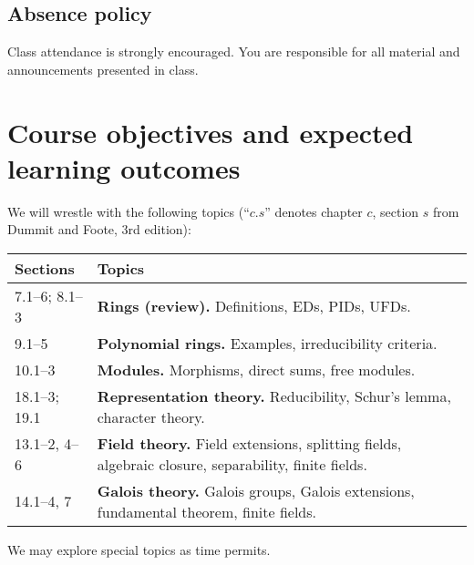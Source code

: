 


\subsection{Absence policy}

Class attendance is strongly encouraged. You are responsible for all material and announcements presented in class.





%
%
%
%

\newpage

\section{Course objectives and expected learning outcomes}

We will wrestle with the following topics (``$c.s$'' denotes chapter $c$, section $s$ from Dummit and Foote, 3rd edition):
\begin{center}
\begin{tabular}{l p{4.8in}}
\hline\hline
Sections		&	Topics									\\
\hline
7.1--6; 8.1--3	&	\textbf{Rings (review).} Definitions, EDs, PIDs, UFDs.	\\
9.1--5			&	\textbf{Polynomial rings.} Examples, irreducibility criteria.	\\
10.1--3			&	\textbf{Modules.} Morphisms, direct sums, free modules.	\\
18.1--3; 19.1	&	\textbf{Representation theory.} Reducibility, Schur's lemma, character theory.	\\
13.1--2, 4--6	&	\textbf{Field theory.} Field extensions, splitting fields, algebraic closure, separability, finite fields.	\\
14.1--4, 7		&	\textbf{Galois theory.} Galois groups, Galois extensions, fundamental theorem, finite fields.	\\
\hline
\end{tabular}
\end{center}
We may explore special topics as time permits.

